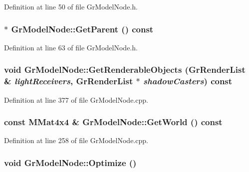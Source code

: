Definition at line 50 of file GrModelNode.h.\hypertarget{class_gr_model_node_e203953dfdbddbb5cf35859187a2e749}{
\subsubsection[{GetParent}]{$\ast$ GrModelNode::GetParent () const}}
\label{class_gr_model_node_e203953dfdbddbb5cf35859187a2e749}




Definition at line 63 of file GrModelNode.h.\hypertarget{class_gr_model_node_ad9c0636157e8cad390826cf91e16780}{
\subsubsection[{GetRenderableObjects}]{\setlength{\rightskip}{0pt plus 5cm}void GrModelNode::GetRenderableObjects ({\bf GrRenderList} \& {\em lightReceivers}, \/  {\bf GrRenderList} $\ast$ {\em shadowCasters}) const}}
\label{class_gr_model_node_ad9c0636157e8cad390826cf91e16780}




Definition at line 377 of file GrModelNode.cpp.\hypertarget{class_gr_model_node_2799107e185b3fb30a4429b1bb0cf1f9}{
\subsubsection[{GetWorld}]{\setlength{\rightskip}{0pt plus 5cm}const {\bf MMat4x4} \& GrModelNode::GetWorld () const}}
\label{class_gr_model_node_2799107e185b3fb30a4429b1bb0cf1f9}




Definition at line 258 of file GrModelNode.cpp.\hypertarget{class_gr_model_node_6dd727604b84d6463b1ba282d0702b4a}{
\subsubsection[{Optimize}]{\setlength{\rightskip}{0pt plus 5cm}void GrModelNode::Optimize ()}}
\label{class_gr_model_node_6dd727604b84d6463b1ba282d0702b4a}





